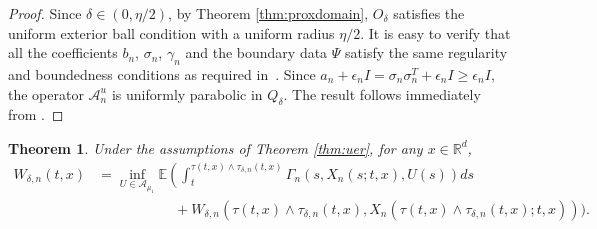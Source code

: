 \documentclass[amscd,amssymb,11pt]{article}
\newtheorem{theorem}{Theorem}
\numberwithin{theorem}{section}
\numberwithin{equation}{section}
\begin{document}
\begin{proof}
Since $\delta\in (0,\eta/2)$, by Theorem \ref{thm:proxdomain}, $O_{\delta}$ satisfies the uniform exterior ball condition with a uniform radius $\eta/2$. It is easy to verify that all the coefficients $b_{n}$, $\sigma_{n}$, $\gamma_{n}$ and the boundary data $\Psi$ satisfy the same regularity and boundedness conditions as required in~\cite[Theorem 5.3]{Mou1:2016}. Since $a_{n}+\epsilon_{n}I=\sigma_{n}\sigma_{n}^{T}+\epsilon_{n}I\geq\epsilon_{n}I$, the operator $\mathcal{A}_{n}^u$ is uniformly parabolic in $Q_{\delta}$. The result follows immediately from \cite[Theorem 5.3]{Mou1:2016}.
\end{proof}
\begin{theorem}\label{thm:wdeltan}
Under the assumptions of Theorem \ref{thm:uer}, for any $x\in\mathbb{R}^{d}$,
\begin{align*}
W_{\delta,n}(t,x)&=\inf_{U\in\mathcal{A}_{\mu_{1}}}\mathbb{E}\left(\int_{t}^{\tau(t,x)\wedge\tau_{\delta,n}(t,x)}\Gamma_{n}\left(s,X_{n}(s;t,x),U(s)\right)ds\right.\\
&\qquad\qquad\quad\,\,\,+W_{\delta,n}\left(\tau(t,x)\wedge\tau_{\delta,n}(t,x),X_{n}(\tau(t,x)\wedge\tau_{\delta,n}(t,x);t,x)\right)\bigg).
\end{align*}
\end{theorem}
\end{document}
